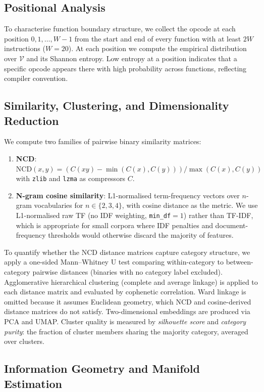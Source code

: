 \documentclass[10pt,twocolumn]{article}
\newcommand{\ncd}{\mathrm{NCD}} %
\newcommand{\zlib}{\texttt{zlib}}
\newcommand{\lzma}{\texttt{lzma}}
\begin{document}
\subsection{Positional Analysis}

To characterise function boundary structure, we collect the opcode at each
position $0, 1, \ldots, W-1$ from the start and end of every function with at
least $2W$ instructions ($W = 20$).  At each position we compute the empirical
distribution over $\mathcal{V}$ and its Shannon entropy.  Low entropy at a
position indicates that a specific opcode appears there with high probability
across functions, reflecting compiler convention.

\subsection{Similarity, Clustering, and Dimensionality Reduction}

We compute two families of pairwise binary similarity matrices:
\begin{enumerate}
  \item \textbf{NCD}: $\ncd(x, y) = (C(xy) - \min(C(x), C(y))) / \max(C(x), C(y))$
        with \zlib{} and \lzma{} as compressors $C$.
  \item \textbf{N-gram cosine similarity}: L1-normalised term-frequency vectors
        over $n$-gram vocabularies for $n \in \{2,3,4\}$, with cosine distance
        as the metric.  We use L1-normalised raw TF (no IDF weighting,
        \texttt{min\_df}$=1$) rather than TF-IDF, which is appropriate for
        small corpora where IDF penalties and document-frequency thresholds
        would otherwise discard the majority of features.
\end{enumerate}
To quantify whether the NCD distance matrices capture category structure, we
apply a one-sided Mann--Whitney U test comparing within-category to
between-category pairwise distances (binaries with no category label excluded).
Agglomerative hierarchical clustering (complete and average linkage) is
applied to each distance matrix and evaluated by cophenetic correlation.
Ward linkage is omitted because it assumes Euclidean geometry, which NCD
and cosine-derived distance matrices do not satisfy.
Two-dimensional embeddings are produced via PCA and UMAP.  Cluster
quality is measured by \emph{silhouette score} and \emph{category purity}:
the fraction of cluster members sharing the majority category, averaged over
clusters.

\subsection{Information Geometry and Manifold Estimation}
\end{document}
